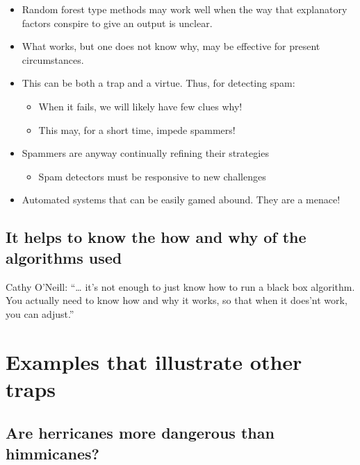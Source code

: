 \documentclass[
  10pt,
  b5paper]{book}
\providecommand{\tightlist}{%
  \setlength{\itemsep}{0pt}\setlength{\parskip}{0pt}}
\begin{document}
\begin{itemize}
\tightlist
\item
  Random forest type methods may work well when the way that
  explanatory factors conspire to give an output is unclear.
\item
  What works, but one does not know why, may be effective for
  present circumstances.
\item
  This can be both a trap and a virtue. Thus, for detecting spam:

  \begin{itemize}
  \tightlist
  \item
    When it fails, we will likely have few clues why!
  \item
    This may, for a short time, impede spammers!
  \end{itemize}
\item
  Spammers are anyway continually refining their strategies

  \begin{itemize}
  \tightlist
  \item
    Spam detectors must be responsive to new challenges
  \end{itemize}
\item
  Automated systems that can be easily gamed abound. They are a
  menace!
\end{itemize}

\hypertarget{it-helps-to-know-the-how-and-why-of-the-algorithms-used}{%
\subsection*{It helps to know the how and why of the algorithms used}\label{it-helps-to-know-the-how-and-why-of-the-algorithms-used}}

Cathy O'Neill: ``\ldots{} it's not enough to just know how to run a black box
algorithm. You actually need to know how and why it works, so that when
it does'nt work, you can adjust.''

\hypertarget{examples-that-illustrate-other-traps}{%
\section{Examples that illustrate other traps}\label{examples-that-illustrate-other-traps}}

\hypertarget{are-herricanes-more-dangerous-than-himmicanes}{%
\subsection*{Are herricanes more dangerous than himmicanes?}\label{are-herricanes-more-dangerous-than-himmicanes}}
\end{document}
